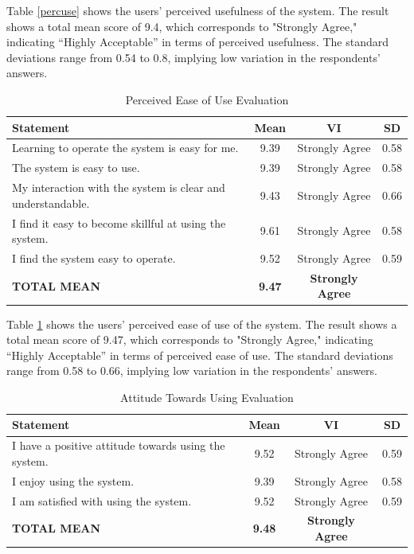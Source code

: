 Table \ref{percuse} shows the users’ perceived usefulness of the system. The result shows a total mean score of 9.4, which corresponds to "Strongly Agree," indicating “Highly Acceptable” in terms of perceived usefulness. The standard deviations range from 0.54 to 0.8, implying low variation in the respondents’ answers.

\begin{table}[ht]
	\centering
	\caption{Perceived Ease of Use Evaluation}
	\label{percease}
	\renewcommand{\arraystretch}{1.2}
	\begin{tabularx}{\linewidth}{|X|c|c|c|}
		\hline
		\textbf{Statement} & \textbf{Mean} & \textbf{VI} & \textbf{SD} \\ \hline
		Learning to operate the system is easy for me.
		& 9.39 & Strongly Agree & 0.58 \\ \hline
		The system is easy to use.
		& 9.39 & Strongly Agree & 0.58 \\ \hline
		My interaction with the system is clear and understandable.
		& 9.43 & Strongly Agree & 0.66 \\ \hline
		I find it easy to become skillful at using the system.
		& 9.61 & Strongly Agree & 0.58 \\ \hline
		I find the system easy to operate.
		& 9.52 & Strongly Agree & 0.59 \\ \hline
		\textbf{TOTAL MEAN} & \textbf{9.47} & \textbf{Strongly Agree} & \\ \hline
	\end{tabularx}
\end{table}

Table \ref{percease} shows the users’ perceived ease of use of the system. The result shows a total mean score of 9.47, which corresponds to "Strongly Agree," indicating “Highly Acceptable” in terms of perceived ease of use. The standard deviations range from 0.58 to 0.66, implying low variation in the respondents’ answers.

\begin{table}[ht]
	\centering
	\caption{Attitude Towards Using Evaluation}
	\label{attuse}
	\renewcommand{\arraystretch}{1.2}
	\begin{tabularx}{\linewidth}{|X|c|c|c|}
		\hline
		\textbf{Statement} & \textbf{Mean} & \textbf{VI} & \textbf{SD} \\ \hline
		I have a positive attitude towards using the system.
		& 9.52 & Strongly Agree & 0.59 \\ \hline
		I enjoy using the system.
		& 9.39 & Strongly Agree & 0.58 \\ \hline
		I am satisfied with using the system.
		& 9.52 & Strongly Agree & 0.59 \\ \hline
		\textbf{TOTAL MEAN} & \textbf{9.48} & \textbf{Strongly Agree} & \\ \hline
	\end{tabularx}
\end{table}

